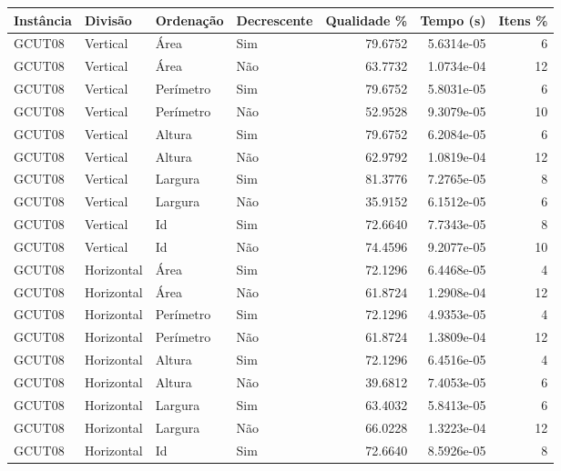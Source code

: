 \begin{tabular}{llllrrr}
\hline
Instância & Divisão     & Ordenação & Decrescente & Qualidade \% & Tempo (s)  & Itens \% \\
\hline
GCUT08    & Vertical    & Área      & Sim         & 79.6752      & 5.6314e-05 & 6        \\
GCUT08    & Vertical    & Área      & Não         & 63.7732      & 1.0734e-04 & 12       \\
GCUT08    & Vertical    & Perímetro & Sim         & 79.6752      & 5.8031e-05 & 6        \\
GCUT08    & Vertical    & Perímetro & Não         & 52.9528      & 9.3079e-05 & 10       \\
GCUT08    & Vertical    & Altura    & Sim         & 79.6752      & 6.2084e-05 & 6        \\
GCUT08    & Vertical    & Altura    & Não         & 62.9792      & 1.0819e-04 & 12       \\
GCUT08    & Vertical    & Largura   & Sim         & 81.3776      & 7.2765e-05 & 8        \\
GCUT08    & Vertical    & Largura   & Não         & 35.9152      & 6.1512e-05 & 6        \\
GCUT08    & Vertical    & Id        & Sim         & 72.6640      & 7.7343e-05 & 8        \\
GCUT08    & Vertical    & Id        & Não         & 74.4596      & 9.2077e-05 & 10       \\
GCUT08    & Horizontal  & Área      & Sim         & 72.1296      & 6.4468e-05 & 4        \\
GCUT08    & Horizontal  & Área      & Não         & 61.8724      & 1.2908e-04 & 12       \\
GCUT08    & Horizontal  & Perímetro & Sim         & 72.1296      & 4.9353e-05 & 4        \\
GCUT08    & Horizontal  & Perímetro & Não         & 61.8724      & 1.3809e-04 & 12       \\
GCUT08    & Horizontal  & Altura    & Sim         & 72.1296      & 6.4516e-05 & 4        \\
GCUT08    & Horizontal  & Altura    & Não         & 39.6812      & 7.4053e-05 & 6        \\
GCUT08    & Horizontal  & Largura   & Sim         & 63.4032      & 5.8413e-05 & 6        \\
GCUT08    & Horizontal  & Largura   & Não         & 66.0228      & 1.3223e-04 & 12       \\
GCUT08    & Horizontal  & Id        & Sim         & 72.6640      & 8.5926e-05 & 8        \\

\end{tabular}
